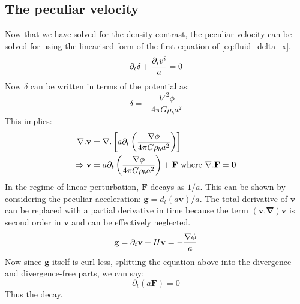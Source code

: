 \documentclass[12pt,a4paper,twoside]{book}
\def\pa{{\partial}}
\begin{document}
		\subsection{The peculiar velocity}
			Now that we have solved for the density contrast, the peculiar velocity can be solved for using the linearised form of the first equation of \ref{eq:fluid_delta_x}.
			$$
				\pa_t\delta+\frac{\pa_iv^i}{a}=0\\
			$$
			Now $\delta$ can be written in terms of the potential as:
			$$
				\delta=-\frac{\nabla^2\phi}{4\pi G\rho_ba^2}
			$$
			This implies:
			$$
			\begin{aligned}
				\nabla.\mathbf{v}&=\nabla.\left[a\pa_t\left(\frac{\nabla\phi}{4\pi G\rho_ba^2}\right)\right]\\
				\Rightarrow\mathbf{v}&=a\pa_t\left(\frac{\nabla\phi}{4\pi G\rho_ba^2}\right)+\mathbf{F}\text{ where $\bf{\nabla.F}=0$}\\
			\end{aligned}
			$$
			In the regime of linear perturbation, $\mathbf{F}$ decays as $1/a$. This can be shown by considering the peculiar acceleration: $\mathbf{g}=d_t(a\mathbf{v})/a$. The total derivative of $\mathbf{v}$ can be replaced with a partial derivative in time because the term $\mathbf{(v.\nabla)v}$ is second order in $\mathbf{v}$ and can be effectively neglected.
			$$
			\mathbf{g}=\pa_t\mathbf{v}+H\mathbf{v}=-\frac{\nabla\phi}{a}\\
			$$
			Now since $\mathbf{g}$ itself is curl-less, splitting the equation above into the divergence and divergence-free parts, we can say:
			$$
				\pa_t(a\mathbf{F})=0
			$$
			Thus the decay. 
\end{document}
